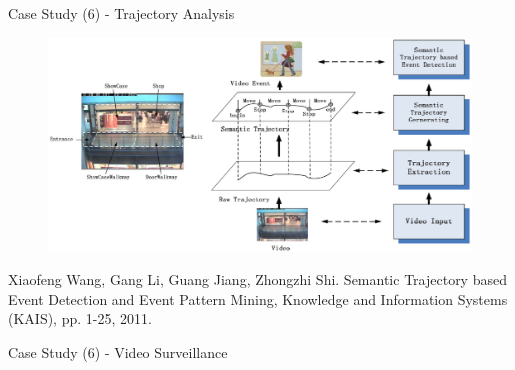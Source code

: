 \documentclass[
 size=14pt,
 paper=smartboard,  %
 mode=present, 		%
 display=slides, 	%
 style=tuliplab,  	%
 pauseslide,
 fleqn,leqno]{powerdot}
\begin{document}
\begin{slide}[toc=,bm=]{Case Study (6) - Trajectory Analysis}
\begin{figure}[htbp]
  \includegraphics[width=1.0\textwidth]{figures//theme1//dsa_3.eps}
\end{figure}
\footnotesize{Xiaofeng Wang, Gang Li, Guang Jiang, Zhongzhi Shi. 
Semantic Trajectory based Event Detection and Event Pattern Mining, 
Knowledge and Information Systems (KAIS), pp. 1-25, 2011.}
\end{slide}


\begin{slide}[toc=,bm=]{Case Study (6) - Video Surveillance}
\begin{figure}[ht]
\end{figure}

\end{slide}
\end{document}

